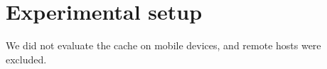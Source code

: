 \section{Experimental setup}
We did not evaluate the cache on mobile devices, and remote hosts were excluded.
